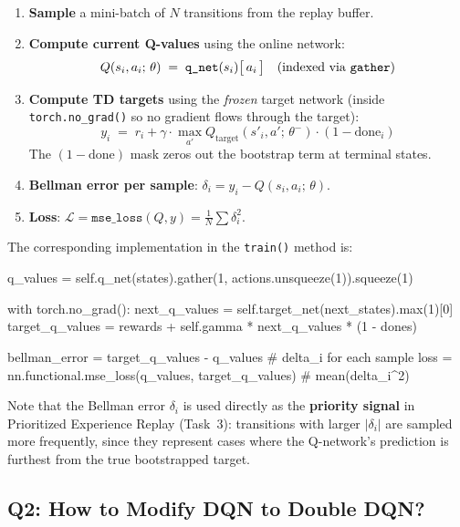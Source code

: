 \documentclass[12pt,a4paper]{report}
\begin{document}
\begin{enumerate}[leftmargin=2em]
  \item \textbf{Sample} a mini-batch of $N$ transitions from the replay buffer.

  \item \textbf{Compute current Q-values} using the online network:
  \[
    Q(s_i, a_i;\,\theta) \;=\;
    \texttt{q\_net}(s_i)\bigl[\,a_i\,\bigr]
    \quad\text{(indexed via \texttt{gather})}
  \]

  \item \textbf{Compute TD targets} using the \emph{frozen} target network
        (inside \texttt{torch.no\_grad()} so no gradient flows through the target):
  \[
    y_i \;=\; r_i + \gamma \cdot
    \max_{a'} Q_{\text{target}}(s'_i, a';\,\theta^-)
    \cdot (1 - \text{done}_i)
  \]
  The $(1 - \text{done})$ mask zeros out the bootstrap term at terminal states.

  \item \textbf{Bellman error per sample}: $\delta_i = y_i - Q(s_i, a_i;\,\theta)$.

  \item \textbf{Loss}: $\mathcal{L} = \texttt{mse\_loss}(Q, y) = \frac{1}{N}\sum \delta_i^2$.
\end{enumerate}

The corresponding implementation in the \texttt{train()} method is:

\begin{pycode}
q_values = self.q_net(states).gather(1, actions.unsqueeze(1)).squeeze(1)

with torch.no_grad():
    next_q_values   = self.target_net(next_states).max(1)[0]
    target_q_values = rewards + self.gamma * next_q_values * (1 - dones)

bellman_error = target_q_values - q_values   # delta_i for each sample
loss = nn.functional.mse_loss(q_values, target_q_values)  # mean(delta_i^2)
\end{pycode}

Note that the Bellman error $\delta_i$ is used directly as the \textbf{priority signal}
in Prioritized Experience Replay (Task~3): transitions with larger $|\delta_i|$ are sampled
more frequently, since they represent cases where the Q-network's prediction is furthest
from the true bootstrapped target.

\subsection*{Q2: How to Modify DQN to Double DQN?}
\end{document}
